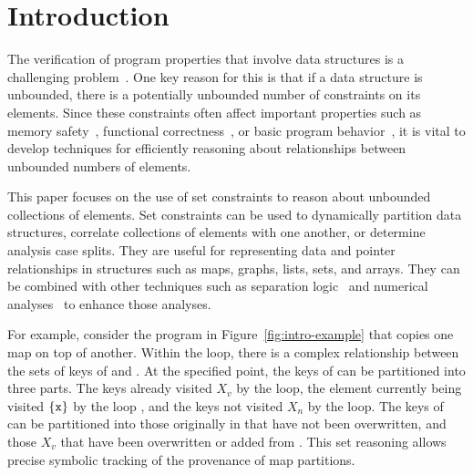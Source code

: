\section{Introduction}
\label{s:1:intro}
The verification of program properties that
involve data structures is a challenging problem~\cite{jahob:thesis:07,compass:popl:11,fixbag:cav:11,celia:vmcai:12,ab:ecoop:13,hoo:14:sas,memcad:15:sas}.
One key reason for this is that
if a data structure is unbounded, there is a potentially unbounded number of constraints on its elements.  Since these constraints often affect important properties such as memory safety~\cite{memcad:15:sas}, functional correctness~\cite{fixbag:cav:11}, or basic program behavior~\cite{hoo:14:sas}, it is vital to develop techniques for efficiently reasoning about relationships between unbounded numbers of elements.

This paper focuses on the use of set constraints to reason about unbounded collections of elements.  Set constraints can be used to dynamically partition data structures, correlate collections of elements with one another, or determine analysis case splits.  They are useful for representing data and pointer relationships in structures such as maps, graphs, lists, sets, and arrays.  They can be combined with other techniques such as separation logic~\cite{hoo:14:sas,memcad:15:sas} and numerical analyses~\cite{quicr:cav:14} to enhance those analyses.

For example, consider the program in Figure~\ref{fig:intro-example}
that copies one map on top of another.
Within the loop, there is a complex relationship between the sets of
keys of  and .
At the specified point, the keys of  can be partitioned into
three parts.
The keys already visited $X_v$ by the loop, the element currently being
visited $\{\texttt{x}\}$ by the loop , and the keys not visited $X_n$ by
the loop.
The keys of  can be partitioned into those originally in
 that have not been overwritten, and those $X_v$ that have
been overwritten or added from .
This set reasoning allows precise symbolic tracking of the provenance
of map partitions.

